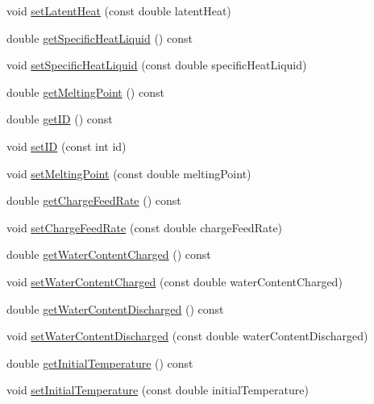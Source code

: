 \begin{DoxyCompactItemize}
\item 
void \hyperlink{class_solid_load_charge_material_ac7361119ab7cc352dfbdc6fcb9175981}{set\+Latent\+Heat} (const double latent\+Heat)
\item 
double \hyperlink{class_solid_load_charge_material_a8b02308194b603276df3a894c401e923}{get\+Specific\+Heat\+Liquid} () const
\item 
void \hyperlink{class_solid_load_charge_material_a91fad347bf52a4f6695c304904091797}{set\+Specific\+Heat\+Liquid} (const double specific\+Heat\+Liquid)
\item 
double \hyperlink{class_solid_load_charge_material_a4be001f6e6ecbd2ad0ae1d154559cdb0}{get\+Melting\+Point} () const
\item 
double \hyperlink{class_solid_load_charge_material_ae34ce5c6f1f362340ead0748aaf885b8}{get\+ID} () const
\item 
void \hyperlink{class_solid_load_charge_material_a4cc8e12ffb340c94106cecf576a85ae5}{set\+ID} (const int id)
\item 
void \hyperlink{class_solid_load_charge_material_a6c235b1c49be98b02829d37af9c38cb2}{set\+Melting\+Point} (const double melting\+Point)
\item 
double \hyperlink{class_solid_load_charge_material_af6f018c5d67e94d86f2f57fecaa32b5c}{get\+Charge\+Feed\+Rate} () const
\item 
void \hyperlink{class_solid_load_charge_material_adc50117256b714789f68097437ca658d}{set\+Charge\+Feed\+Rate} (const double charge\+Feed\+Rate)
\item 
double \hyperlink{class_solid_load_charge_material_a2f99a8553d12b45bad53acc14338199a}{get\+Water\+Content\+Charged} () const
\item 
void \hyperlink{class_solid_load_charge_material_abf43422318a1b9120dff1dcfb15d5265}{set\+Water\+Content\+Charged} (const double water\+Content\+Charged)
\item 
double \hyperlink{class_solid_load_charge_material_aeeb6b341a6b5770155b85264dabbd1a7}{get\+Water\+Content\+Discharged} () const
\item 
void \hyperlink{class_solid_load_charge_material_a5104ddb43af977a751b90a0bc844d83d}{set\+Water\+Content\+Discharged} (const double water\+Content\+Discharged)
\item 
double \hyperlink{class_solid_load_charge_material_ae5d7f198fb1d4a3adb0cfc911a13ea06}{get\+Initial\+Temperature} () const
\item 
void \hyperlink{class_solid_load_charge_material_ac80e565d26e68e542f4cb41f41b7d96c}{set\+Initial\+Temperature} (const double initial\+Temperature)

\end{DoxyCompactItemize}
